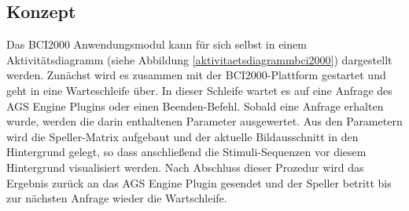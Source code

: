 \subsection{Konzept}

Das \acs{BCI2000} Anwendungsmodul kann für sich selbst in einem Aktivitätsdiagramm (siehe Abbildung \ref{aktivitaetsdiagrammbci2000}) dargestellt werden. 
Zunächst wird es zusammen mit der \acs{BCI2000}-Plattform gestartet und geht in eine Warteschleife über. 
In dieser Schleife wartet es auf eine Anfrage des AGS Engine Plugins oder einen Beenden-Befehl.
Sobald eine Anfrage erhalten wurde, werden die darin enthaltenen Parameter ausgewertet.
Aus den Parametern wird die Speller-Matrix aufgebaut und der aktuelle Bildausschnitt in den Hintergrund gelegt, so dass anschließend die Stimuli-Sequenzen vor diesem Hintergrund visualisiert werden.
Nach Abschluss dieser Prozedur wird das Ergebnis zurück an das AGS Engine Plugin gesendet und der Speller betritt bis zur nächsten Anfrage wieder die Wartschleife. \\\\




